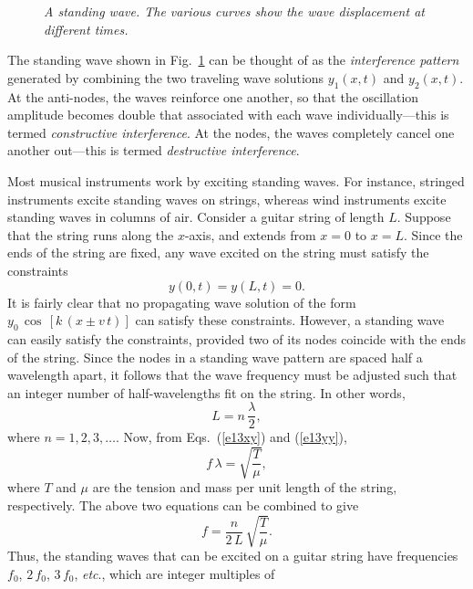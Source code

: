 \begin{figure}
\epsfysize=3in
\centerline{}
\caption{\em A standing wave. The various curves show the wave displacement at
 different times.}\label{f113}  
\end{figure}

The standing wave shown in Fig.~\ref{f113} can be thought of as the {\em interference pattern} generated
by combining the two traveling wave solutions $y_1(x,t)$ and $y_2(x,t)$. At the anti-nodes, the waves
reinforce one another, so that the oscillation amplitude becomes double that associated with each
wave individually---this is termed {\em constructive interference}. At the
nodes, the waves completely cancel one another out---this is termed {\em destructive interference}.

Most musical instruments work by exciting standing waves. 
For instance, stringed instruments excite standing
waves on strings, whereas wind instruments excite standing waves in columns of air.
Consider a
guitar string of length $L$. Suppose that the string runs along the $x$-axis, and
extends from $x=0$ to $x=L$. Since the ends of the string are fixed, any wave excited
on the string must satisfy the constraints
\begin{equation}
y(0,t) = y(L, t) = 0.
\end{equation}
It is fairly clear that no propagating wave solution of the form $y_0\,\cos\,[k\,(x\pm v\,t)]$
can satisfy these constraints. However, a standing wave can easily satisfy the 
constraints, provided two of its nodes coincide with the ends of the string. Since
the nodes in a standing wave pattern are spaced half a wavelength apart, it follows that
the wave frequency must be adjusted such that an integer number of half-wavelengths
fit on the string. In other words,
\begin{equation}
L = n\,\frac{\lambda}{2},
\end{equation}
where $n=1,2,3,\ldots$. Now, from Eqs.~(\ref{e13xy}) and (\ref{e13yy}),
\begin{equation}
f\,\lambda = \sqrt{\frac{T}{\mu}},
\end{equation}
where $T$ and $\mu$ are the tension and mass per unit length of the string, respectively.
The above two equations can be combined to give
\begin{equation}
f = \frac{n}{2\,L}\,\sqrt{\frac{T}{\mu}}.
\end{equation}
Thus, the standing waves that can be excited on a guitar string have frequencies
$f_0$, $2\,f_0$, $3\,f_0$, {\em etc}.,  which are integer multiples of
